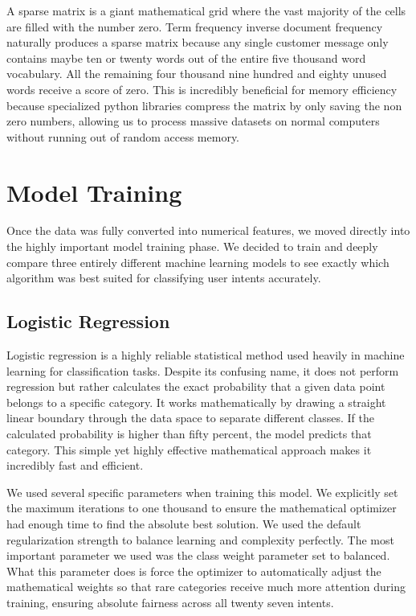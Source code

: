 \documentclass[12pt]{article}
\begin{document}
A sparse matrix is a giant mathematical grid where the vast majority of the cells are filled with the number zero. Term frequency inverse document frequency naturally produces a sparse matrix because any single customer message only contains maybe ten or twenty words out of the entire five thousand word vocabulary. All the remaining four thousand nine hundred and eighty unused words receive a score of zero. This is incredibly beneficial for memory efficiency because specialized python libraries compress the matrix by only saving the non zero numbers, allowing us to process massive datasets on normal computers without running out of random access memory.

\section{Model Training}
Once the data was fully converted into numerical features, we moved directly into the highly important model training phase. We decided to train and deeply compare three entirely different machine learning models to see exactly which algorithm was best suited for classifying user intents accurately. 

\subsection{Logistic Regression}
Logistic regression is a highly reliable statistical method used heavily in machine learning for classification tasks. Despite its confusing name, it does not perform regression but rather calculates the exact probability that a given data point belongs to a specific category. It works mathematically by drawing a straight linear boundary through the data space to separate different classes. If the calculated probability is higher than fifty percent, the model predicts that category. This simple yet highly effective mathematical approach makes it incredibly fast and efficient.

We used several specific parameters when training this model. We explicitly set the maximum iterations to one thousand to ensure the mathematical optimizer had enough time to find the absolute best solution. We used the default regularization strength to balance learning and complexity perfectly. The most important parameter we used was the class weight parameter set to balanced. What this parameter does is force the optimizer to automatically adjust the mathematical weights so that rare categories receive much more attention during training, ensuring absolute fairness across all twenty seven intents.
\end{document}

